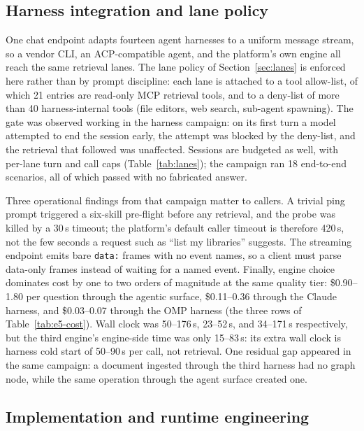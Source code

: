 \subsection{Harness integration and lane policy}
\label{sec:impl-harness}

One chat endpoint adapts fourteen agent harnesses to a uniform message
stream, so a vendor CLI, an ACP-compatible agent, and the platform's own
engine all reach the same retrieval lanes. The lane policy of
Section~\ref{sec:lanes} is enforced here rather than by prompt discipline:
each lane is attached to a tool allow-list, of which 21 entries are
read-only MCP retrieval tools, and to a deny-list of more than 40
harness-internal tools (file editors, web search, sub-agent spawning). The
gate was observed working in the harness campaign: on its first turn a model
attempted to end the session early, the attempt was blocked by the
deny-list, and the retrieval that followed was unaffected. Sessions are
budgeted as well, with per-lane turn and call caps
(Table~\ref{tab:lanes}); the campaign ran 18 end-to-end scenarios, all of
which passed with no fabricated answer.

Three operational findings from that campaign matter to callers. A trivial
ping prompt triggered a six-skill pre-flight before any retrieval, and the
probe was killed by a 30\,s timeout; the platform's default caller timeout
is therefore 420\,s, not the few seconds a request such as ``list my
libraries'' suggests. The streaming endpoint emits bare \texttt{data:}
frames with no event names, so a client must parse data-only frames instead
of waiting for a named event. Finally, engine choice dominates cost by one
to two orders of magnitude at the same quality tier: \$0.90--1.80 per
question through the agentic surface, \$0.11--0.36 through the Claude
harness, and \$0.03--0.07 through the OMP harness (the three rows of
Table~\ref{tab:e5-cost}). Wall clock was 50--176\,s, 23--52\,s, and
34--171\,s respectively, but the third engine's engine-side time was only
15--83\,s: its extra wall clock is harness cold start of 50--90\,s per call,
not retrieval. One residual gap appeared in the same campaign: a document
ingested through the third harness had no graph node, while the same
operation through the agent surface created one.

\subsection{Implementation and runtime engineering}
\label{sec:impl-runtime}

